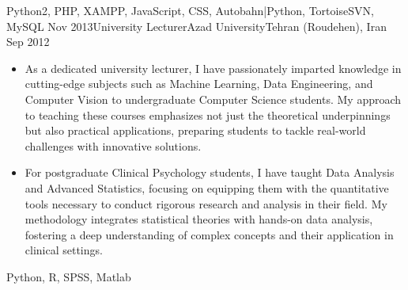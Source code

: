 \begin{experiences}
{\begin{itemize}
		\end{itemize}
	}
	{Python2, PHP, XAMPP, JavaScript, CSS, Autobahn|Python, TortoiseSVN, MySQL}
	\emptySeparator
	\experience
	{Nov 2013}{University Lecturer}{Azad University}{Tehran (Roudehen), Iran}
	{Sep 2012} {
		\begin{itemize}
			\item As a dedicated university lecturer, I have passionately imparted knowledge in cutting-edge subjects such as Machine Learning, Data Engineering, and Computer Vision to undergraduate Computer Science students. My approach to teaching these courses emphasizes not just the theoretical underpinnings but also practical applications, preparing students to tackle real-world challenges with innovative solutions.

			\item For postgraduate Clinical Psychology students, I have taught Data Analysis and Advanced Statistics, focusing on equipping them with the quantitative tools necessary to conduct rigorous research and analysis in their field. My methodology integrates statistical theories with hands-on data analysis, fostering a deep understanding of complex concepts and their application in clinical settings.

		\end{itemize}
	}
	{Python, R, SPSS, Matlab}
\end{experiences}
